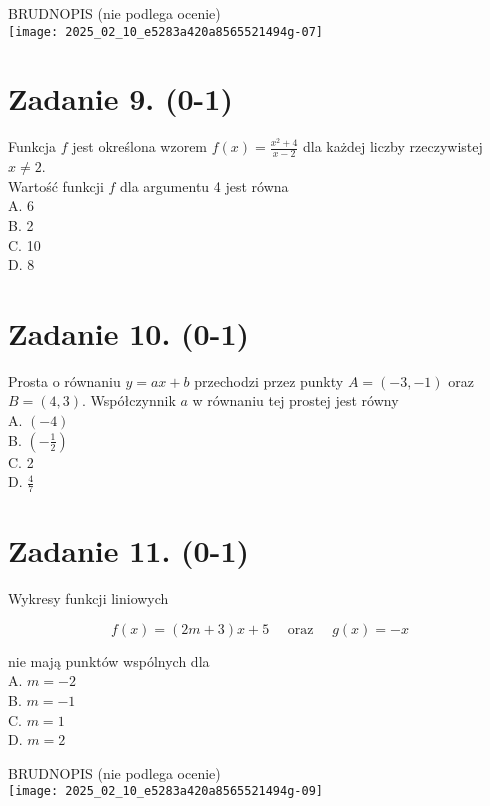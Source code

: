 \documentclass[10pt]{article}
\begin{document}
BRUDNOPIS (nie podlega ocenie)\\
\texttt{[image: 2025\_02\_10\_e5283a420a8565521494g-07]}

\section*{Zadanie 9. (0-1)}
Funkcja \(f\) jest określona wzorem \(f(x)=\frac{x^{2}+4}{x-2}\) dla każdej liczby rzeczywistej \(x \neq 2\).\\
Wartość funkcji \(f\) dla argumentu 4 jest równa\\
A. 6\\
B. 2\\
C. 10\\
D. 8

\section*{Zadanie 10. (0-1)}
Prosta o równaniu \(y=a x+b\) przechodzi przez punkty \(A=(-3,-1)\) oraz \(B=(4,3)\). Współczynnik \(a\) w równaniu tej prostej jest równy\\
A. \((-4)\)\\
B. \(\left(-\frac{1}{2}\right)\)\\
C. 2\\
D. \(\frac{4}{7}\)

\section*{Zadanie 11. (0-1)}
Wykresy funkcji liniowych

\[
f(x)=(2 m+3) x+5 \quad \text { oraz } \quad g(x)=-x
\]

nie mają punktów wspólnych dla\\
A. \(m=-2\)\\
B. \(m=-1\)\\
C. \(m=1\)\\
D. \(m=2\)

BRUDNOPIS (nie podlega ocenie)\\
\texttt{[image: 2025\_02\_10\_e5283a420a8565521494g-09]}
\end{document}
